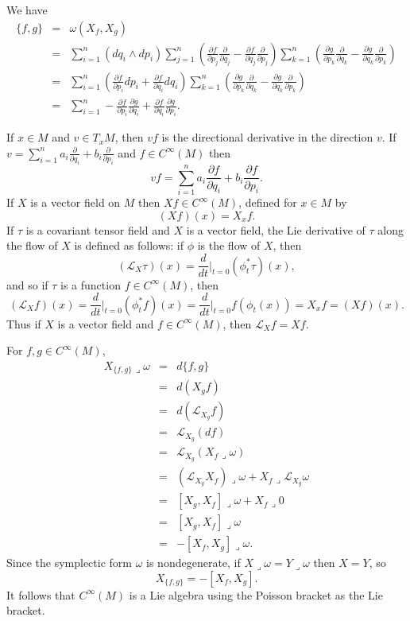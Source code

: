 \documentclass{article}
\begin{document}
We have
\begin{eqnarray*}
\{f,g\}&=&\omega(X_f,X_g)\\
&=&\sum_{i=1}^n (dq_i \wedge dp_i) \sum_{j=1}^n  \left( \frac{\partial f}{\partial p_j} \frac{\partial}{\partial q_j}-\frac{\partial f}{\partial q_j}\frac{\partial}{\partial p_j} \right)
 \sum_{k=1}^n  \left( \frac{\partial g}{\partial p_k} \frac{\partial}{\partial q_k}-\frac{\partial g}{\partial q_k}\frac{\partial}{\partial p_k} \right)\\
 &=&\sum_{i=1}^n  \left( \frac{\partial f}{\partial p_i} dp_i + \frac{\partial f}{\partial q_i} dq_i \right) \sum_{k=1}^n  \left( \frac{\partial g}{\partial p_k} \frac{\partial}{\partial q_k}-\frac{\partial g}{\partial q_k}\frac{\partial}{\partial p_k} \right)\\
 &=&\sum_{i=1}^n -\frac{\partial f}{\partial p_i} \frac{\partial g}{\partial q_i}+\frac{\partial f}{\partial q_i} \frac{\partial g}{\partial p_i}.
\end{eqnarray*}

If $x \in M$ and $v \in T_xM$,  then $vf$ is the directional derivative in the direction $v$. If $v=\sum_{i=1}^n a_i \frac{\partial}{\partial q_i}+b_i \frac{\partial}{\partial p_i}$
and $f \in C^\infty(M)$ then
\[
vf=\sum_{i=1}^n a_i \frac{\partial f}{\partial q_i}+b_i \frac{\partial f}{\partial p_i}.
\]
If $X$ is a vector field on $M$ then $Xf \in C^\infty(M)$, defined for
$x \in M$ by
\[
(Xf)(x)=X_x f.
\]
If $\tau$ is a covariant tensor field and $X$ is a vector field, the Lie derivative of $\tau$ along the flow of $X$ is defined as follows: if $\phi$ is the flow of $X$, then
\[
(\mathcal{L}_X \tau)(x)=\frac{d}{dt}\Big|_{t=0} (\phi_t^* \tau)(x),
\]
and so if $\tau$ is a function $f \in C^\infty(M)$, then
\[
(\mathcal{L}_X f)(x)=\frac{d}{dt}\Big|_{t=0} (\phi_t^* f)(x)=\frac{d}{dt}\Big|_{t=0} f(\phi_t(x))=X_x f = (Xf)(x).
\]
Thus if $X$ is a vector field and $f \in C^\infty(M)$, then $\mathcal{L}_X f=Xf$.

For $f,g\in C^\infty(M)$,
\begin{eqnarray*}
X_{\{f,g\}} \lrcorner \omega&=&d\{f,g\}\\
&=&d(X_g f)\\
&=&d(\mathcal{L}_{X_g} f)\\
&=&\mathcal{L}_{X_g}(df)\\
&=&\mathcal{L}_{X_g}(X_f \lrcorner \omega)\\
&=&(\mathcal{L}_{X_g} X_f)\lrcorner \omega+X_f \lrcorner \mathcal{L}_{X_g}\omega\\
&=&[X_g,X_f]\lrcorner \omega + X_f \lrcorner 0\\
&=&[X_g,X_f]\lrcorner \omega\\
&=&-[X_f,X_g]\lrcorner \omega.
\end{eqnarray*}
Since the symplectic form $\omega$ is nondegenerate, if $X \lrcorner \omega= Y \lrcorner \omega$ then $X=Y$, so
\[
X_{\{f,g\}}=-[X_f,X_g].
\]
It follows that $C^\infty(M)$ is a Lie algebra using the Poisson bracket as the Lie bracket.
\end{document}
